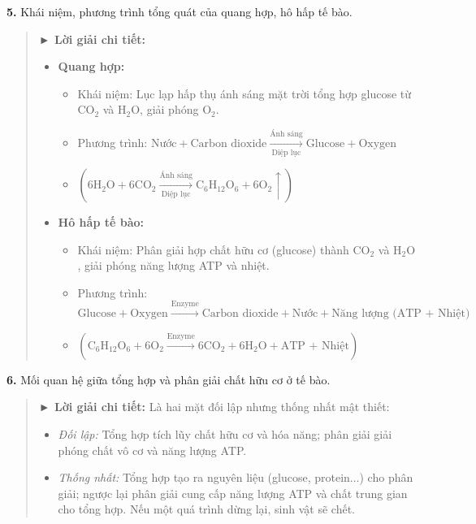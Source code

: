 \documentclass[11pt,a4paper]{article}
\begin{document}
\textbf{5.} Khái niệm, phương trình tổng quát của quang hợp, hô hấp tế bào.

\begin{quote}\small
{\color{myBlue}\textbf{► Lời giải chi tiết:}}
\begin{itemize}[leftmargin=*,itemsep=1pt]
  \item \textbf{Quang hợp:}
    \begin{itemize}
      \item Khái niệm: Lục lạp hấp thụ ánh sáng mặt trời tổng hợp glucose từ $\text{CO}_2$ và $\text{H}_2\text{O}$, giải phóng $\text{O}_2$.
      \item Phương trình: $\text{Nước} + \text{Carbon dioxide} \xrightarrow[\text{Diệp lục}]{\text{Ánh sáng}} \text{Glucose} + \text{Oxygen}$
      \item $(6\text{H}_2\text{O} + 6\text{CO}_2 \xrightarrow[\text{Diệp lục}]{\text{Ánh sáng}} \text{C}_6\text{H}_{12}\text{O}_6 + 6\text{O}_2\uparrow)$
    \end{itemize}
  \item \textbf{Hô hấp tế bào:}
    \begin{itemize}
      \item Khái niệm: Phân giải hợp chất hữu cơ (glucose) thành $\text{CO}_2$ và $\text{H}_2\text{O}$, giải phóng năng lượng ATP và nhiệt.
      \item Phương trình: $\text{Glucose} + \text{Oxygen} \xrightarrow{\text{Enzyme}} \text{Carbon dioxide} + \text{Nước} + \text{Năng lượng (ATP + Nhiệt)}$
      \item $(\text{C}_6\text{H}_{12}\text{O}_6 + 6\text{O}_2 \xrightarrow{\text{Enzyme}} 6\text{CO}_2 + 6\text{H}_2\text{O} + \text{ATP + Nhiệt})$
    \end{itemize}
\end{itemize}
\end{quote}

\textbf{6.} Mối quan hệ giữa tổng hợp và phân giải chất hữu cơ ở tế bào.

\begin{quote}\small
{\color{myBlue}\textbf{► Lời giải chi tiết:}}
Là hai mặt đối lập nhưng thống nhất mật thiết:
\begin{itemize}[leftmargin=*,itemsep=1pt]
  \item \textit{Đối lập:} Tổng hợp tích lũy chất hữu cơ và hóa năng; phân giải giải phóng chất vô cơ và năng lượng ATP.
  \item \textit{Thống nhất:} Tổng hợp tạo ra nguyên liệu (glucose, protein...) cho phân giải; ngược lại phân giải cung cấp năng lượng ATP và chất trung gian cho tổng hợp. Nếu một quá trình dừng lại, sinh vật sẽ chết.
\end{itemize}
\end{quote}
\end{document}

